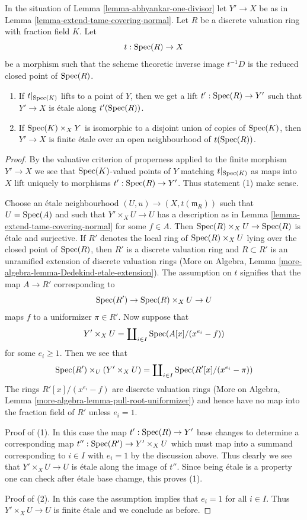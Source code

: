 \begin{lemma}
\label{lemma-tame-covering-split}
In the situation of Lemma \ref{lemma-abhyankar-one-divisor}
let $Y' \to X$ be as in Lemma \ref{lemma-extend-tame-covering-normal}.
Let $R$ be a discrete valuation ring with fraction field $K$.
Let
$$
t : \mathop{\mathrm{Spec}}(R) \to X
$$
be a morphism such that the scheme theoretic inverse image
$t^{-1}D$ is the reduced closed point of $\mathop{\mathrm{Spec}}(R)$.
\begin{enumerate}
\item If $t|_{\mathop{\mathrm{Spec}}(K)}$ lifts to a point of $Y$, then
we get a lift $t' : \mathop{\mathrm{Spec}}(R) \to Y'$ such that $Y' \to X$
is \'etale along $t'(\mathop{\mathrm{Spec}}(R))$.
\item If $\mathop{\mathrm{Spec}}(K) \times_X Y$ is isomorphic to a disjoint union
of copies of $\mathop{\mathrm{Spec}}(K)$, then $Y' \to X$ is finite \'etale
over an open neighbourhood of $t(\mathop{\mathrm{Spec}}(R))$.
\end{enumerate}
\end{lemma}

\begin{proof}
By the valuative criterion of properness applied to
the finite morphism $Y' \to X$ we see that $\mathop{\mathrm{Spec}}(K)$-valued
points of $Y$ matching $t|_{\mathop{\mathrm{Spec}}(K)}$ as maps into $X$
lift uniquely to morphisms $t' : \mathop{\mathrm{Spec}}(R) \to Y'$.
Thus statement (1) make sense.

\medskip\noindent
Choose an \'etale neighbourhood $(U, u) \to (X, t(\mathfrak m_R))$
such that $U = \mathop{\mathrm{Spec}}(A)$ and such that $Y' \times_X U \to U$
has a description as in Lemma \ref{lemma-extend-tame-covering-normal}
for some $f \in A$. Then $\mathop{\mathrm{Spec}}(R) \times_X U \to \mathop{\mathrm{Spec}}(R)$ is \'etale
and surjective. If $R'$ denotes the local ring of
$\mathop{\mathrm{Spec}}(R) \times_X U$ lying over the closed point of $\mathop{\mathrm{Spec}}(R)$,
then $R'$ is a discrete valuation ring and $R \subset R'$
is an unramified extension of discrete valuation rings
(More on Algebra, Lemma \ref{more-algebra-lemma-Dedekind-etale-extension}).
The assumption on $t$ signifies that the map $A \to R'$
corresponding to
$$
\mathop{\mathrm{Spec}}(R') \to \mathop{\mathrm{Spec}}(R) \times_X U \to U
$$
maps $f$ to a uniformizer $\pi \in R'$. Now suppose that
$$
Y' \times_X U =
\coprod\nolimits_{i \in I} \mathop{\mathrm{Spec}}(A[x]/(x^{e_i} - f))
$$
for some $e_i \geq 1$. Then we see that
$$
\mathop{\mathrm{Spec}}(R') \times_U (Y' \times_X U) =
\coprod\nolimits_{i \in I} \mathop{\mathrm{Spec}}(R'[x]/(x^{e_i} - \pi))
$$
The rings $R'[x]/(x^{e_i} - f)$ are discrete valuation rings
(More on Algebra, Lemma \ref{more-algebra-lemma-pull-root-uniformizer})
and hence have no map into the fraction field of $R'$ unless $e_i = 1$.

\medskip\noindent
Proof of (1). In this case the map $t' : \mathop{\mathrm{Spec}}(R) \to Y'$ base changes
to determine a corresponding map $t'' : \mathop{\mathrm{Spec}}(R') \to Y' \times_X U$
which must map into a summand corresponding to $i \in I$ with $e_i = 1$
by the discussion above. Thus clearly we see that $Y' \times_X U \to U$
is \'etale along the image of $t''$. Since being \'etale is a property
one can check after \'etale base chamge, this proves (1).

\medskip\noindent
Proof of (2). In this case the assumption implies that $e_i = 1$
for all $i \in I$. Thus $Y' \times_X U \to U$ is finite \'etale
and we conclude as before.
\end{proof}

